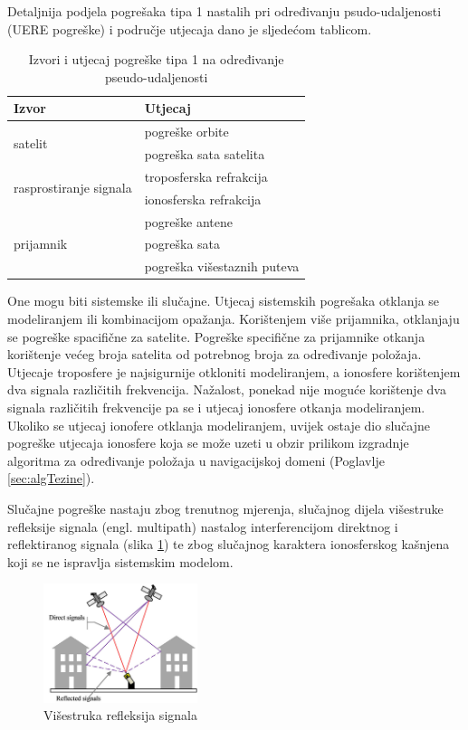 \documentclass[a4paper,twoside,12pt]{memoir} %
\begin{document}
	
	
	Detaljnija podjela pogrešaka tipa 1 nastalih 
	pri određivanju psudo-udaljenosti (UERE pogreške) i područje utjecaja dano je sljedećom tablicom.
	
	\begin{table}[H]\centering
		\caption{Izvori i utjecaj pogreške tipa 1 na određivanje pseudo-udaljenosti}
		\begin{tabular}{ |p{3cm}|p{4cm}| }
			\hline
			\rowcolor{lightgray} Izvor & Utjecaj \\[0.5ex]
			\hline\hline
			\multirow{2}{4em}{satelit} & pogreške orbite  \\ 
			& pogreška sata satelita   \\ 
			\hline
			\multirow{2}{4em}{rasprostiranje signala} & troposferska refrakcija  \\ 
			& ionosferska refrakcija  \\
			\hline
			\multirow{4}{4em}{prijamnik} & pogreške antene  \\ 
			& pogreška sata\\ 
			\cline{2-2}
			& pogreška višestaznih puteva \\
			\hline
		\end{tabular}
	\end{table}	
	
	One mogu biti sistemske ili slučajne. %
	Utjecaj sistemskih pogrešaka otklanja se modeliranjem ili
	kombinacijom opažanja.
	Korištenjem više prijamnika, otklanjaju se pogreške spacifične za satelite.
	Pogreške specifične za prijamnike otkanja korištenje većeg broja satelita od
	potrebnog broja za određivanje položaja.
	Utjecaje troposfere je najsigurnije otkloniti modeliranjem,
	a ionosfere korištenjem dva signala različitih frekvencija.
	Nažalost, ponekad nije moguće korištenje dva signala različitih frekvencije
	pa se i utjecaj ionosfere otkanja modeliranjem. Ukoliko se utjecaj ionofere otklanja
	modeliranjem, uvijek ostaje dio slučajne pogreške utjecaja ionosfere
	koja se može uzeti u obzir prilikom izgradnje algoritma za određivanje položaja
	u navigacijskoj domeni (Poglavlje \ref{sec:algTezine}).
	
	Slučajne pogreške nastaju zbog trenutnog mjerenja, slučajnog dijela
	višestruke refleksije signala (engl. multipath) nastalog interferencijom 
	direktnog i reflektiranog signala (slika \ref{fig:multipath}) te zbog slučajnog karaktera ionosferskog kašnjena koji se ne ispravlja sistemskim modelom.
	\begin{figure}[H]
		\centering
		\includegraphics[width=0.4\textwidth]{multipath}
		\caption{Višestruka refleksija signala}
		\label{fig:multipath}
	\end{figure}
	
\end{document}

